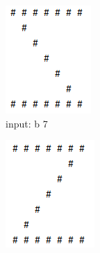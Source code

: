\begin{figure}[H]
\begin{subfigure}{0.19\linewidth}
		\includegraphics[width=1\linewidth]{../pic/4/4.b.png}
        \caption{input: b 7}
	\end{subfigure}
	\begin{subfigure}{0.19\linewidth}
		\centering
		\includegraphics[width=1\linewidth]{../pic/4/4.c.png}

\end{subfigure}
\end{figure}
